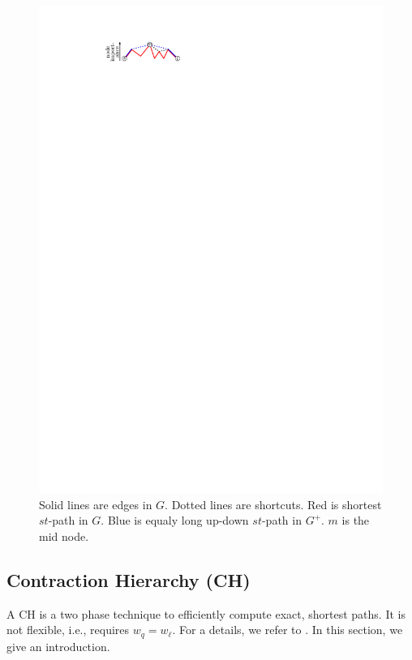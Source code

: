 \documentclass[letterpaper]{article} %
\begin{document}
\begin{figure}
\centering
\includegraphics{fig/ch}
\caption{
Solid lines are edges in $G$. Dotted lines are shortcuts. Red is shortest $st$-path in $G$. Blue is equaly long up-down $st$-path in $G^+$. $m$ is the mid node.
}
\label{fig:ch}
\end{figure}

\subsection{Contraction Hierarchy (CH)}

A CH is a two phase technique to efficiently compute exact, shortest paths.
It is not flexible, i.e., requires $w_q=w_\ell$.
For a details, we refer to \cite{gssv-erlrn-12,dsw-cch-15}.
In this section, we give an introduction.
\end{document}

